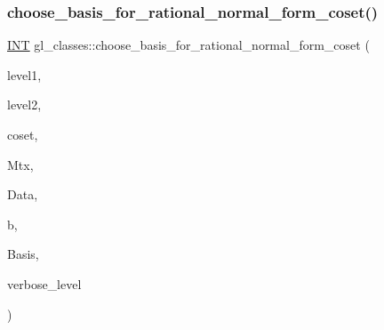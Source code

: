 \mbox{\label{classgl__classes_a0228b3ef9958351ac8f55d3ca5444f17}} 
\subsubsection{\texorpdfstring{choose\+\_\+basis\+\_\+for\+\_\+rational\+\_\+normal\+\_\+form\+\_\+coset()}{choose\_basis\_for\_rational\_normal\_form\_coset()}}
{\footnotesize\ttfamily \mbox{\hyperlink{galois_8h_a09fddde158a3a20bd2dcadb609de11dc}{I\+NT}} gl\+\_\+classes\+::choose\+\_\+basis\+\_\+for\+\_\+rational\+\_\+normal\+\_\+form\+\_\+coset (\begin{DoxyParamCaption}\item[{\mbox{\hyperlink{galois_8h_a09fddde158a3a20bd2dcadb609de11dc}{I\+NT}}}]{level1,  }\item[{\mbox{\hyperlink{galois_8h_a09fddde158a3a20bd2dcadb609de11dc}{I\+NT}}}]{level2,  }\item[{\mbox{\hyperlink{galois_8h_a09fddde158a3a20bd2dcadb609de11dc}{I\+NT}} \&}]{coset,  }\item[{\mbox{\hyperlink{galois_8h_a09fddde158a3a20bd2dcadb609de11dc}{I\+NT}} $\ast$}]{Mtx,  }\item[{\mbox{\hyperlink{classmatrix__block__data}{matrix\+\_\+block\+\_\+data}} $\ast$}]{Data,  }\item[{\mbox{\hyperlink{galois_8h_a09fddde158a3a20bd2dcadb609de11dc}{I\+NT}} \&}]{b,  }\item[{\mbox{\hyperlink{galois_8h_a09fddde158a3a20bd2dcadb609de11dc}{I\+NT}} $\ast$}]{Basis,  }\item[{\mbox{\hyperlink{galois_8h_a09fddde158a3a20bd2dcadb609de11dc}{I\+NT}}}]{verbose\+\_\+level }\end{DoxyParamCaption})}

\mbox{\label{classgl__classes_a81f5a74f6e3ddf095578fa860c347e9f}} 
